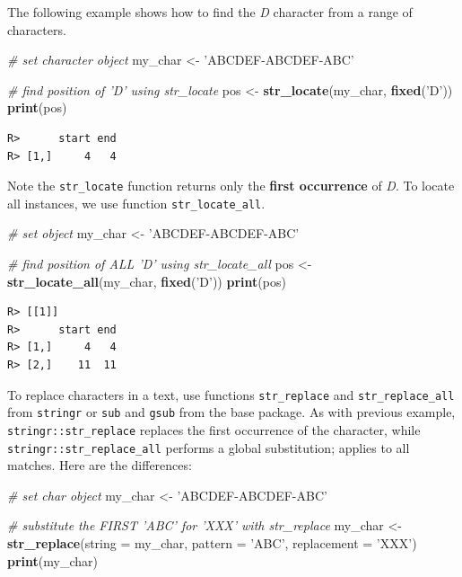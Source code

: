 \documentclass[
  12pt,
]{book}
\newenvironment{Shaded}{\begin{snugshade}}{\end{snugshade}}
\newcommand{\CommentTok}[1]{\textcolor[rgb]{0.37,0.37,0.37}{\textit{#1}}}
\newcommand{\DataTypeTok}[1]{\textcolor[rgb]{0.27,0.27,0.27}{#1}}
\newcommand{\KeywordTok}[1]{\textcolor[rgb]{0.27,0.27,0.27}{\textbf{#1}}}
\newcommand{\NormalTok}[1]{#1}
\newcommand{\StringTok}[1]{\textcolor[rgb]{0.5,0.5,0.5}{#1}}
\begin{document}
The following example shows how to find the \emph{D} character from a range of characters.

\begin{Shaded}
\begin{Highlighting}[]
\CommentTok{# set character object}
\NormalTok{my_char <-}\StringTok{ 'ABCDEF-ABCDEF-ABC'}

\CommentTok{# find position of 'D' using str_locate}
\NormalTok{pos <-}\StringTok{ }\KeywordTok{str_locate}\NormalTok{(my_char, }\KeywordTok{fixed}\NormalTok{(}\StringTok{'D'}\NormalTok{))}
\KeywordTok{print}\NormalTok{(pos)}
\end{Highlighting}
\end{Shaded}

\begin{verbatim}
R>      start end
R> [1,]     4   4
\end{verbatim}

Note the \texttt{str\_locate} function returns only the \textbf{first occurrence} of \emph{D}. To locate all instances, we use function \texttt{str\_locate\_all}.

\begin{Shaded}
\begin{Highlighting}[]
\CommentTok{# set object}
\NormalTok{my_char <-}\StringTok{ 'ABCDEF-ABCDEF-ABC'}

\CommentTok{# find position of ALL 'D' using str_locate_all}
\NormalTok{pos <-}\StringTok{ }\KeywordTok{str_locate_all}\NormalTok{(my_char, }\KeywordTok{fixed}\NormalTok{(}\StringTok{'D'}\NormalTok{))}
\KeywordTok{print}\NormalTok{(pos)}
\end{Highlighting}
\end{Shaded}

\begin{verbatim}
R> [[1]]
R>      start end
R> [1,]     4   4
R> [2,]    11  11
\end{verbatim}

To replace characters in a text, use functions \texttt{str\_replace} and \texttt{str\_replace\_all} from \texttt{stringr} or \texttt{sub} and \texttt{gsub} from the base package. As with previous example, \texttt{stringr::str\_replace} replaces the first occurrence of the character, while \texttt{stringr::str\_replace\_all} performs a global substitution; applies to all matches. Here are the differences:    

\begin{Shaded}
\begin{Highlighting}[]
\CommentTok{# set char object}
\NormalTok{my_char <-}\StringTok{ 'ABCDEF-ABCDEF-ABC'}

\CommentTok{# substitute the FIRST 'ABC' for 'XXX' with str_replace}
\NormalTok{my_char <-}\StringTok{ }\KeywordTok{str_replace}\NormalTok{(}\DataTypeTok{string =}\NormalTok{ my_char,}
                       \DataTypeTok{pattern =} \StringTok{'ABC'}\NormalTok{,}
                       \DataTypeTok{replacement =} \StringTok{'XXX'}\NormalTok{)}
\KeywordTok{print}\NormalTok{(my_char)}
\end{Highlighting}
\end{Shaded}
\end{document}
